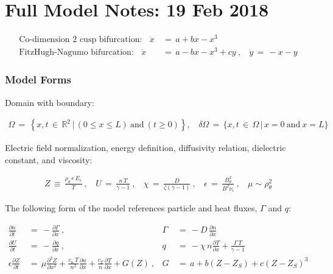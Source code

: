 \documentclass[a4paper,8pt]{article}
\date{}
\begin{document}
\section{Full Model Notes: 19 Feb
2018}\label{full-model-notes-19-feb-2018}

\small

\begin{align}
    \text{Co-dimension 2 cusp bifurcation:} ~~~~ \dot{x} \,&=\, a + bx - x^3 \\
    \text{FitzHugh-Nagumo bifurcation:} ~~~~ \dot{x} \,&=\, a - bx - x^3 + cy~, ~~~~ \dot{y} \,=\, -x - y
\end{align}

\normalsize

\subsubsection{Model Forms}\label{model-forms}

Domain with boundary: \small

\begin{align}
    \Omega \,=\, \left\{x, t \,\in\, \mathbb{R}^2 \,|\, (0 \leq x \leq L) ~\text{and}~ (t \geq 0)\right\}, ~~~~ \delta\Omega \,=\, \{x, t \,\in\, \Omega \,|\, x = 0 ~\text{and}~ x = L \}
\end{align}

\normalsize

Electric field normalization, energy definition, diffusivity relation,
dielectric constant, and viscosity: \small

\begin{align}
    Z \,\equiv\, \frac{\rho_\theta \, e \, E_r}{T}~, ~~~~ U \,=\, \frac{n\,T}{\gamma - 1}~, ~~~~ \chi \,=\, \frac{D}{\zeta(\gamma - 1)}~, ~~~~ \epsilon \,=\, \frac{B_\theta^2}{B^2 \nu_i}~, ~~~~ \mu \sim \rho_\theta^2
\end{align}

\normalsize

The following form of the model references particle and heat fluxes,
\(\Gamma\) and \(q\): \small

\begin{align}
    \frac{\partial n}{\partial t} \,&=\, -\frac{\partial \Gamma}{\partial x}~, &\Gamma \,&=\, -D \, \frac{\partial n}{\partial x} \\
    \frac{\partial U}{\partial t} \,&=\, -\frac{\partial q}{\partial x}~, &q \,&=\, -\chi \, n \frac{\partial T}{\partial x} + \frac{\Gamma\,T}{\gamma - 1} \\
    \epsilon \frac{\partial Z}{\partial t} \,&=\, \mu \frac{\partial^2 Z}{\partial x^2} + \frac{c_n \, T}{n^2} \frac{\partial n}{\partial x} + \frac{c_T}{n} \frac{\partial T}{\partial x} + G(Z)~, &G \,&=\, a + b(Z - Z_S) + c(Z - Z_S)^3
\end{align}
\end{document}
